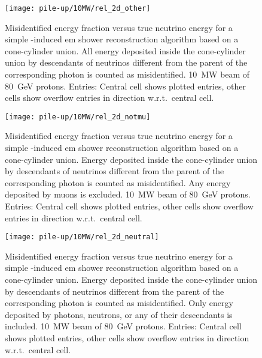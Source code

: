 \begin{figure}[tbp]
	\centering
	\texttt{[image: pile-up/10MW/rel\_2d\_other]}
	\caption[Pile-up study misidentified fractional vs.\ true neutrino energy, \SI{10}{\mega\watt} beam]{%
		Misidentified energy fraction versus true neutrino energy for a simple \Pgpz-induced \acrshort{em} shower reconstruction algorithm based on a cone-cylinder union.
		All energy deposited inside the cone-cylinder union by descendants of neutrinos different from the parent of the corresponding \Pgpz photon is counted as misidentified.
		\SI{10}{\mega\watt} beam of \SI{80}{\giga\electronvolt} protons.
		Entries: Central cell shows plotted entries, other cells show overflow entries in direction w.r.t.\ central cell.
	}
\end{figure}

\begin{figure}[tbp]
	\centering
	\texttt{[image: pile-up/10MW/rel\_2d\_notmu]}
	\caption[Pile-up study misidentified fractional vs.\ true neutrino energy, no muons, \SI{10}{\mega\watt} beam]{%
		Misidentified energy fraction versus true neutrino energy for a simple \Pgpz-induced \acrshort{em} shower reconstruction algorithm based on a cone-cylinder union.
		Energy deposited inside the cone-cylinder union by descendants of neutrinos different from the parent of the corresponding \Pgpz photon is counted as misidentified.
		Any energy deposited by muons is excluded.
		\SI{10}{\mega\watt} beam of \SI{80}{\giga\electronvolt} protons.
		Entries: Central cell shows plotted entries, other cells show overflow entries in direction w.r.t.\ central cell.
	}
\end{figure}

\begin{figure}[tbp]
	\centering
	\texttt{[image: pile-up/10MW/rel\_2d\_neutral]}
	\caption[Pile-up study misidentified fractional vs.\ true neutrino energy, only neutrals, \SI{10}{\mega\watt} beam]{%
		Misidentified energy fraction versus true neutrino energy for a simple \Pgpz-induced \acrshort{em} shower reconstruction algorithm based on a cone-cylinder union.
		Energy deposited inside the cone-cylinder union by descendants of neutrinos different from the parent of the corresponding \Pgpz photon is counted as misidentified.
		Only energy deposited by photons, neutrons, or any of their descendants is included.
		\SI{10}{\mega\watt} beam of \SI{80}{\giga\electronvolt} protons.
		Entries: Central cell shows plotted entries, other cells show overflow entries in direction w.r.t.\ central cell.
	}
\end{figure}

